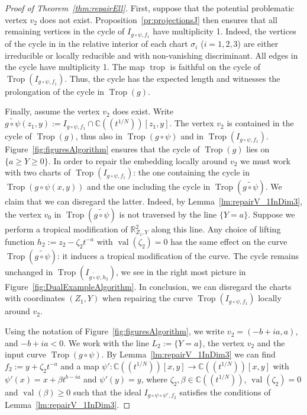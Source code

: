 \documentclass[11pt]{amsart}
\numberwithin{equation}{section}
\theoremstyle{plain}
\theoremstyle{definition}
\theoremstyle{remark}
\begin{document}
\begin{proof} [Proof of Theorem~\ref{thm:repairEll}]
  First, suppose that the potential problematic vertex $v_2$ does not
  exist. Proposition~\ref{pr:projectionsJ} then ensures that all
  remaining vertices in the cycle of $I_{g\circ \psi,f_{1}}$ have
  multiplicity 1. Indeed, the vertices of the cycle in in the relative
  interior of each chart $\sigma_i$ ($i=1,2,3$) are either irreducible
  or locally reducible and with non-vanishing discriminant. All edges
  in the cycle have multiplicity 1. The map $\operatorname{trop}$ is faithful on the
  cycle of $\operatorname{Trop}(I_{g\circ \psi, f_{1}})$. Thus, the cycle has the
  expected length and witnesses the prolongation of the cycle in
  $\operatorname{Trop}(g)$.  \smallskip

  Finally, assume the vertex $v_2$ does exist. Write
  $\widetilde{g\circ \psi}(z_{1},y):= I_{g\circ\psi,f_{1}}\cap
  {{\mathbb{C}}(\!(t^{1/N})\!)}[z_{1},y]$. The vertex $v_2$ is contained in the cycle of $\operatorname{Trop}(g)$,
  thus also in $\operatorname{Trop}(g\circ \psi)$ and in $\operatorname{Trop}(I_{g\circ \psi,
    f_{1}})$. Figure~\ref{fig:figuresAlgorithm} ensures that the cycle
  of $\operatorname{Trop}(g)$ lies on $\{a\geq Y\geq 0\}$.  In order to repair the
  embedding locally around $v_2$ we must work with two charts of
  $\operatorname{Trop}(I_{g\circ \psi, f_{1}})$: the one containing the cycle in $\operatorname{Trop}(g\circ
  \psi(x,y))$ and the one including the cycle in $\operatorname{Trop}(\widetilde{g\circ
    \psi})$. We claim that we can disregard the latter.
  Indeed, by Lemma~\ref{lm:repairV_1InDim3}, the
 vertex $v_0$ in $\operatorname{Trop}( \widetilde{g\circ \psi})$ is not
 traversed by the line $\{Y=a\}$. Suppose we perform a tropical
 modification of ${\mathbb{R}}^2_{Z_{1},Y}$ along this line. Any choice
 of lifting function $h_2:=z_2-{\zeta}_2 t^{-a}$ with $\operatorname{val}({\zeta}_2)=0$  
has  the same effect on the curve $\operatorname{Trop}(\widetilde{g\circ
   \psi})$:  it induces a tropical modification of the curve. The cycle  remains unchanged in
 $\operatorname{Trop}(I_{\widetilde{g\circ
     \psi},h_2})$, 
we see in  the right most picture in Figure~\ref{fig:DualExampleAlgorithm}.
 In conclusion, we can disregard the charts
 with coordinates $(Z_1,Y)$  when repairing the curve
 $\operatorname{Trop}(I_{g\circ \psi,f_{1}})$ locally around $v_2$. 

 Using the notation of Figure~\ref{fig:figuresAlgorithm}, we write
 $v_2=(-b+i a ,a)$, and $-b+ia<0$. We work with the line
 $L_2:=\{Y=a\}$, the vertex $v_2$ and the input curve $\operatorname{Trop}(g\circ
 \psi)$.  By Lemma~\ref{lm:repairV_1InDim3} we can find $f_2:=y+{\zeta}_2
 t^{-a}$ and a map $\psi'\colon {{\mathbb{C}}(\!(t^{1/N})\!)}[x,y]\to {{\mathbb{C}}(\!(t^{1/N})\!)}[x,y]$ with
 $\psi'(x)=x+\beta t^{b-ia}$ and $\psi'(y)=y$, where ${\zeta}_2,\beta\in
 {{\mathbb{C}}(\!(t^{1/N})\!)}$, $\operatorname{val}({\zeta}_2)=0$ and $\operatorname{val}(\beta)\geq 0$ such that the ideal
 $I_{g\circ \psi\circ \psi', f_2}$ satisfies the conditions of
 Lemma~\ref{lm:repairV_1InDim3}.


\end{proof}
\end{document}
